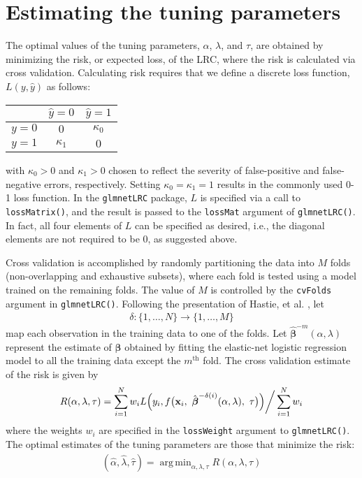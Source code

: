 \documentclass{article}
\DeclareMathOperator*{\argmin}{arg\,min}
\begin{document}
\section{Estimating the tuning parameters}

The optimal values of the tuning parameters, $\alpha$, $\lambda$, and $\tau$, are obtained by minimizing 
the risk, or expected loss, of 
the LRC, where the risk is calculated via cross validation.  Calculating risk requires that we define a discrete 
loss function, $L(y,\hat{y})$ as follows:
\begin{table}[H]
\begin{center}
\begin{tabular}{c|cc}
& $\hat{y} = 0$ & $\hat{y} = 1$ \\
\hline
$y = 0$ & $0$ & $\kappa_0$ \\
$y = 1$ & $\kappa_1$ & $0$ \\
\end{tabular}
\end{center}
\end{table}
\noindent with $\kappa_0 > 0$ and $\kappa_1 > 0$ chosen to reflect the severity of false-positive and 
false-negative errors, respectively.  Setting $\kappa_0 = \kappa_1 = 1$ results in the commonly used 0-1 loss
function.  In the {\tt glmnetLRC} package, $L$ is specified via a call to {\tt lossMatrix()}, and the result is passed to
the {\tt lossMat} argument of {\tt glmnetLRC()}.  In fact, all four elements of $L$ can be specified as desired, i.e.,
the diagonal elements are not required to be 0, as suggested above.

Cross validation is accomplished by randomly partitioning the data into $M$ folds (non-overlapping and
exhaustive subsets), where each fold is tested using a model trained on the remaining folds. 
The value of $M$ is controlled by the {\tt cvFolds} argument in 
{\tt glmnetLRC()}. Following the presentation of Hastie, et al. \citeyear{Hastie}, let
\begin{align}
\label{eq:cv_map}
\delta:\{1,\ldots,N\} \rightarrow \{1, \ldots, M\}
\end{align}
\noindent map each observation in the training data to one of the folds.
Let $\hat{\boldsymbol{\beta}}^{-m}(\alpha,\lambda)$ represent the estimate of $\boldsymbol\beta$ obtained by
fitting the elastic-net logistic regression model to all the training data except the $m^{\text{th}}$ fold.
The cross validation estimate of the risk is given by
\begin{align}
\label{eq:risk}
R(\alpha,\lambda,\tau) = \sum_{i=1}^N w_i L \Bigl(y_i, f\bigl(\mathbf{x}_i,
~\hat{\boldsymbol{\beta}}^{-\delta(i)}(\alpha,\lambda), ~\tau \bigr) \Bigr) \bigg/ \sum_{i=1}^N w_i
\end{align}
\noindent where the weights $w_i$ are specified in the {\tt lossWeight} argument to {\tt glmnetLRC()}. 
The optimal estimates of the tuning parameters are those that minimize the risk:
\begin{align}
\label{eq:tuning_estimates}
(\hat\alpha,\hat\lambda,\hat\tau) = \argmin_{\alpha,\lambda,\tau} R(\alpha,\lambda,\tau)
\end{align}
\end{document}
